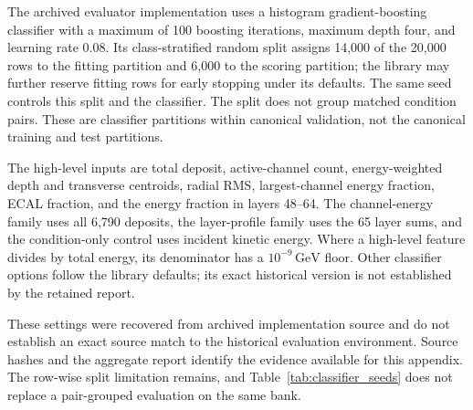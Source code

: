 \documentclass[11pt]{article}
\newcommand{\GeV}{\,\mathrm{GeV}}
\begin{document}
The archived evaluator implementation uses a histogram gradient-boosting classifier with a maximum of 100 boosting iterations, maximum depth four, and learning rate 0.08. Its class-stratified random split assigns 14,000 of the 20,000 rows to the fitting partition and 6,000 to the scoring partition; the library may further reserve fitting rows for early stopping under its defaults. The same seed controls this split and the classifier. The split does not group matched condition pairs. These are classifier partitions within canonical validation, not the canonical training and test partitions.

The high-level inputs are total deposit, active-channel count, energy-weighted depth and transverse centroids, radial RMS, largest-channel energy fraction, ECAL fraction, and the energy fraction in layers 48--64. The channel-energy family uses all 6,790 deposits, the layer-profile family uses the 65 layer sums, and the condition-only control uses incident kinetic energy. Where a high-level feature divides by total energy, its denominator has a $10^{-9}\GeV$ floor. Other classifier options follow the library defaults; its exact historical version is not established by the retained report.

These settings were recovered from archived implementation source and do not establish an exact source match to the historical evaluation environment. Source hashes and the aggregate report identify the evidence available for this appendix. The row-wise split limitation remains, and Table~\ref{tab:classifier_seeds} does not replace a pair-grouped evaluation on the same bank.

\clearpage
\printbibliography
\end{document}
